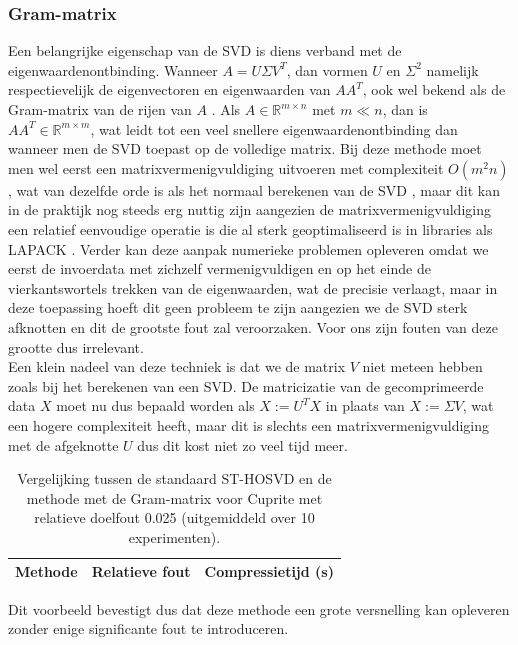 \subsubsection{Gram-matrix}

Een belangrijke eigenschap van de SVD is diens verband met de eigenwaardenontbinding. Wanneer $A = U \Sigma V^T$, dan vormen $U$ en $\Sigma^2$ namelijk respectievelijk de eigenvectoren en eigenwaarden van $A A^T$, ook wel bekend als de Gram-matrix van de rijen van $A$ \cite{ref:svd}. Als $A \in \mathbb{R}^{m \times n}$ met $m \ll n$, dan is $A A^T \in \mathbb{R}^{m \times m}$, wat leidt tot een veel snellere eigenwaardenontbinding dan wanneer men de SVD toepast op de volledige matrix. Bij deze methode moet men wel eerst een matrixvermenigvuldiging uitvoeren met complexiteit $O(m^2 n)$, wat van dezelfde orde is als het normaal berekenen van de SVD \cite{ref:svd}, maar dit kan in de praktijk nog steeds erg nuttig zijn aangezien de matrixvermenigvuldiging een relatief eenvoudige operatie is die al sterk geoptimaliseerd is in libraries als LAPACK \cite{ref:lapack}. Verder kan deze aanpak numerieke problemen opleveren omdat we eerst de invoerdata met zichzelf vermenigvuldigen en op het einde de vierkantswortels trekken van de eigenwaarden, wat de precisie verlaagt, maar in deze toepassing hoeft dit geen probleem te zijn aangezien we de SVD sterk afknotten en dit de grootste fout zal veroorzaken. Voor ons zijn fouten van deze grootte dus irrelevant.\\

Een klein nadeel van deze techniek is dat we de matrix $V$ niet meteen hebben zoals bij het berekenen van een SVD. De matricizatie van de gecomprimeerde data $X$ moet nu dus bepaald worden als $X := U^T X$ in plaats van $X := \Sigma V$, wat een hogere complexiteit heeft, maar dit is slechts een matrixvermenigvuldiging met de afgeknotte $U$ dus dit kost niet zo veel tijd meer.\\

\begin{table}[H]
\centering
\begin{tabular}{|l|l|l|}
\hline
Methode & Relatieve fout & Compressietijd (s)\\ \hline

\end{tabular}
\caption{Vergelijking tussen de standaard ST-HOSVD en de methode met de Gram-matrix voor Cuprite met relatieve doelfout 0.025 (uitgemiddeld over 10 experimenten).}
\end{table}
Dit voorbeeld bevestigt dus dat deze methode een grote versnelling kan opleveren zonder enige significante fout te introduceren.

